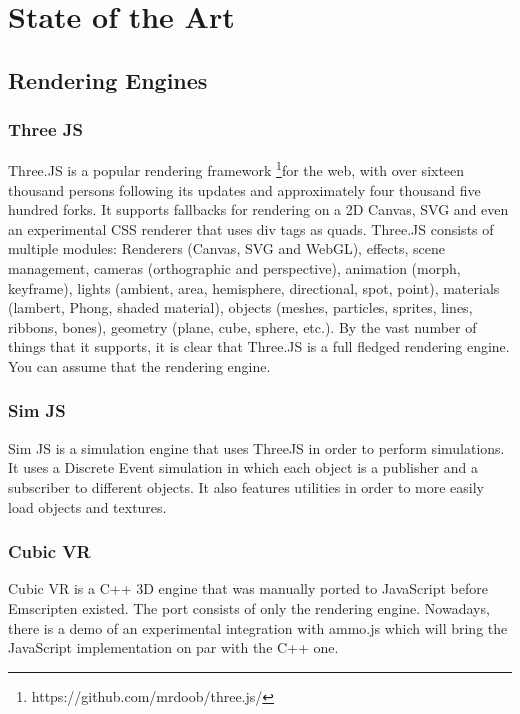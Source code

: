 \chapter{State of the Art}
\label{chapter:Chapter 2}




\section{Rendering Engines}
\subsection {Three JS}

Three.JS is a popular rendering framework \footnote{https://github.com/mrdoob/three.js/}for the web, with over sixteen thousand persons following its updates and approximately four thousand five hundred forks. It supports fallbacks for rendering on a 2D Canvas, SVG and even an experimental CSS renderer that uses div tags as quads.
Three.JS consists of multiple modules: Renderers (Canvas, SVG and WebGL), effects, scene management, cameras (orthographic and perspective), animation (morph, keyframe), lights (ambient, area, hemisphere, directional, spot, point), materials (lambert, Phong, shaded material), objects (meshes, particles, sprites, lines, ribbons, bones), geometry (plane, cube, sphere, etc.).
By the vast number of things that it supports, it is clear that Three.JS is a full fledged rendering engine. You can assume that the rendering engine.



\subsection{Sim JS}
 
Sim JS is a simulation engine that uses ThreeJS in order to perform simulations. It uses a Discrete Event simulation in which each object is a publisher and a subscriber to different objects. It also features utilities in order to more easily load objects and textures.

\subsection{Cubic VR}

Cubic VR is a C++ 3D engine that was manually ported to JavaScript before Emscripten existed. The port consists of only the rendering engine. Nowadays, there is a demo of an experimental integration with ammo.js which will bring the JavaScript implementation on par with the C++ one.

